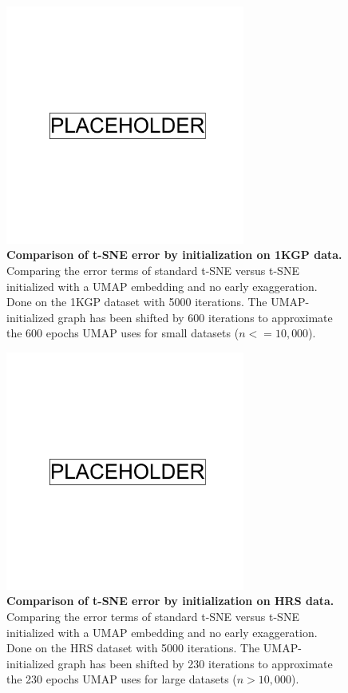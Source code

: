 \newpage

\begin{figure}[!htb]
    \centering
    \includegraphics[width=0.7\textwidth]{placeholder.png}
    \caption[Comparison of t-SNE error by initialization on 1KGP data]{\textbf{Comparison of t-SNE error by initialization on 1KGP data.} Comparing the error terms of standard t-SNE versus t-SNE initialized with a UMAP embedding and no early exaggeration. Done on the 1KGP dataset with 5000 iterations. The UMAP-initialized graph has been shifted by 600 iterations to approximate the 600 epochs UMAP uses for small datasets ($n<=10,000$).}
    \label{fig:supp_tsne_umap_compare_1kgp_graph}
\end{figure}

\newpage

\begin{figure}[!htb]
    \centering
    \includegraphics[width=0.7\textwidth]{placeholder.png}
    \caption[Comparison of t-SNE error by initialization on HRS data]{\textbf{Comparison of t-SNE error by initialization on HRS data.} Comparing the error terms of standard t-SNE versus t-SNE initialized with a UMAP embedding and no early exaggeration. Done on the HRS dataset with 5000 iterations. The UMAP-initialized graph has been shifted by 230 iterations to approximate the 230 epochs UMAP uses for large datasets ($n>10,000$).}
    \label{fig:supp_tsne_umap_compare_hrs_graph}
\end{figure}

